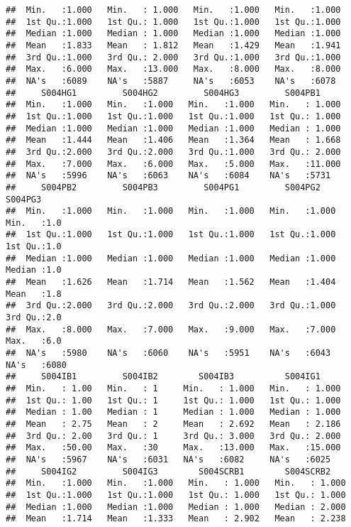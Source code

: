 \documentclass[
]{article}
\begin{document}
\begin{verbatim}
##  Min.   :1.000   Min.   : 1.000   Min.   :1.000   Min.   :1.000  
##  1st Qu.:1.000   1st Qu.: 1.000   1st Qu.:1.000   1st Qu.:1.000  
##  Median :1.000   Median : 1.000   Median :1.000   Median :1.000  
##  Mean   :1.833   Mean   : 1.812   Mean   :1.429   Mean   :1.941  
##  3rd Qu.:1.000   3rd Qu.: 2.000   3rd Qu.:1.000   3rd Qu.:1.000  
##  Max.   :6.000   Max.   :13.000   Max.   :8.000   Max.   :8.000  
##  NA's   :6089    NA's   :5887     NA's   :6053    NA's   :6078   
##     S004HG1         S004HG2         S004HG3         S004PB1      
##  Min.   :1.000   Min.   :1.000   Min.   :1.000   Min.   : 1.000  
##  1st Qu.:1.000   1st Qu.:1.000   1st Qu.:1.000   1st Qu.: 1.000  
##  Median :1.000   Median :1.000   Median :1.000   Median : 1.000  
##  Mean   :1.444   Mean   :1.406   Mean   :1.364   Mean   : 1.668  
##  3rd Qu.:2.000   3rd Qu.:2.000   3rd Qu.:1.000   3rd Qu.: 2.000  
##  Max.   :7.000   Max.   :6.000   Max.   :5.000   Max.   :11.000  
##  NA's   :5996    NA's   :6063    NA's   :6084    NA's   :5731    
##     S004PB2         S004PB3         S004PG1         S004PG2         S004PG3    
##  Min.   :1.000   Min.   :1.000   Min.   :1.000   Min.   :1.000   Min.   :1.0   
##  1st Qu.:1.000   1st Qu.:1.000   1st Qu.:1.000   1st Qu.:1.000   1st Qu.:1.0   
##  Median :1.000   Median :1.000   Median :1.000   Median :1.000   Median :1.0   
##  Mean   :1.626   Mean   :1.714   Mean   :1.562   Mean   :1.404   Mean   :1.8   
##  3rd Qu.:2.000   3rd Qu.:2.000   3rd Qu.:2.000   3rd Qu.:1.000   3rd Qu.:2.0   
##  Max.   :8.000   Max.   :7.000   Max.   :9.000   Max.   :7.000   Max.   :6.0   
##  NA's   :5980    NA's   :6060    NA's   :5951    NA's   :6043    NA's   :6080  
##     S004IB1         S004IB2        S004IB3          S004IG1      
##  Min.   : 1.00   Min.   : 1     Min.   : 1.000   Min.   : 1.000  
##  1st Qu.: 1.00   1st Qu.: 1     1st Qu.: 1.000   1st Qu.: 1.000  
##  Median : 1.00   Median : 1     Median : 1.000   Median : 1.000  
##  Mean   : 2.75   Mean   : 2     Mean   : 2.692   Mean   : 2.186  
##  3rd Qu.: 2.00   3rd Qu.: 1     3rd Qu.: 3.000   3rd Qu.: 2.000  
##  Max.   :50.00   Max.   :30     Max.   :13.000   Max.   :15.000  
##  NA's   :5967    NA's   :6031   NA's   :6082     NA's   :6025    
##     S004IG2         S004IG3        S004SCRB1        S004SCRB2     
##  Min.   :1.000   Min.   :1.000   Min.   : 1.000   Min.   : 1.000  
##  1st Qu.:1.000   1st Qu.:1.000   1st Qu.: 1.000   1st Qu.: 1.000  
##  Median :1.000   Median :1.000   Median : 1.000   Median : 2.000  
##  Mean   :1.714   Mean   :1.333   Mean   : 2.902   Mean   : 2.238  

\end{verbatim}
\end{document}
